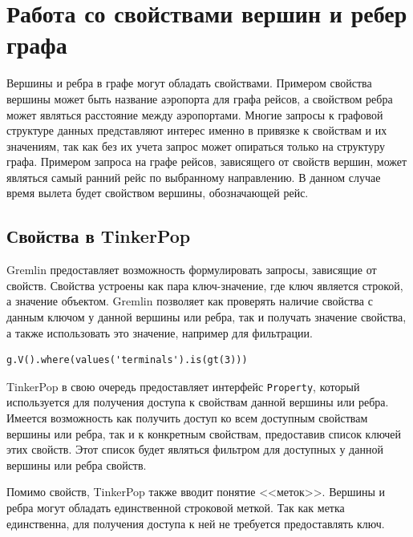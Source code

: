 \documentclass[times,specification,annotation]{itmo-student-thesis}
\begin{document}
\section{Работа со свойствами вершин и ребер графа}

Вершины и ребра в графе могут обладать свойствами. Примером свойства вершины может быть название аэропорта для графа рейсов, а свойством ребра может являться расстояние между аэропортами.
Многие запросы к графовой структуре данных представляют интерес именно в привязке к свойствам и их значениям, так как без их учета запрос может опираться только на структуру графа. Примером запроса на графе рейсов, зависящего от свойств вершин, может являться самый ранний рейс по выбранному направлению. В данном случае время вылета будет свойством вершины, обозначающей рейс.

\subsection{Свойства в TinkerPop}

Gremlin предоставляет возможность формулировать запросы, зависящие от свойств. Свойства устроены как пара ключ-значение, где ключ является строкой, а значение объектом. Gremlin позволяет как проверять наличие свойства с данным ключом у данной вершины или ребра, так и получать  значение свойства, а также использовать это значение, например для фильтрации.

\begin{lstlisting}[float=!h,caption={Пример запроса на Gremlin, зависящего от свойств},label={lst2}]
g.V().where(values('terminals').is(gt(3)))
\end{lstlisting}

TinkerPop в свою очередь предоставляет интерфейс \texttt{Property}, который используется для получения доступа к свойствам данной вершины или ребра. Имеется возможность как получить доступ ко всем доступным свойствам вершины или ребра, так и к конкретным свойствам, предоставив список ключей этих свойств. Этот список будет являться фильтром для доступных у данной вершины или ребра свойств.

Помимо свойств, TinkerPop также вводит понятие <<меток>>. Вершины и ребра могут обладать единственной строковой меткой. Так как метка единственна, для получения доступа к ней не требуется предоставлять ключ.
\end{document}
